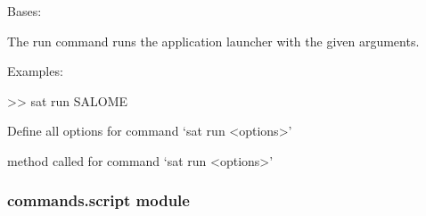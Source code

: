 \documentclass[a4paper,10pt,english]{sphinxmanual}
\begin{document}
\begin{fulllineitems}
\label{\detokenize{apidoc_commands/commands:commands.run.Command}}
Bases: 

The run command runs the application launcher with the given arguments.

\begin{DUlineblock}{0em}
\item[] Examples:
\item[] \textgreater{}\textgreater{} sat run SALOME
\end{DUlineblock}

\begin{fulllineitems}
\label{\detokenize{apidoc_commands/commands:commands.run.Command.getParser}}
Define all options for command ‘sat run \textless{}options\textgreater{}’

\end{fulllineitems}


\begin{fulllineitems}
\label{\detokenize{apidoc_commands/commands:commands.run.Command.name}}
\end{fulllineitems}


\begin{fulllineitems}
\label{\detokenize{apidoc_commands/commands:commands.run.Command.run}}
method called for command ‘sat run \textless{}options\textgreater{}’

\end{fulllineitems}


\end{fulllineitems}



\subsubsection{commands.script module}
\label{\detokenize{apidoc_commands/commands:module-commands.script}}\label{\detokenize{apidoc_commands/commands:commands-script-module}}
\end{document}
